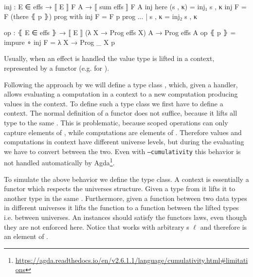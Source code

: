 \begin{code}
inj : E ∈ effs → ⟦ E ⟧ F A → ⟦ sum effs ⟧ F A
inj here           (s , κ) = inj₁ s , κ
inj {F = F} (there ⦃ p ⦄)  prog with inj {F = F} p prog
... | s , κ = inj₂ s , κ

op : ⦃ E ∈ effs ⦄ → ⟦ E ⟧ (λ X → Prog effs X) A → Prog effs A
op ⦃ p ⦄ = impure ∘ inj {F = λ X → Prog _ X} p
\end{code}
Usually, when an effect is handled the value type is lifted in a context,
represented by a functor (e.g.  for ).

Following the approach by \citeauthor{DBLP:conf/haskell/WuSH14} we will define a
type class , which, given a handler, allows evaluating a
computation in a context to a new computation producing values in the context.
To define such a type class we first have to define a context.
The normal definition of a functor does not suffice, because it lifts all type
to the same .
This is problematic, because scoped operations can only capture elements of
, while computations are elements of .
Therefore values and computations in context have different universe levels, but
during the evaluating we have to convert between the two. 
Even with \texttt{--cumulativity} this behavior is not handled automatically by
Agda\footnote{\url{https://agda.readthedocs.io/en/v2.6.1.1/language/cumulativity.html\#limitations}}.

To simulate the above behavior we define the  type class.
A context is essentially a functor which respects the universes structure.
Given a type from  it lifts it to another type in the same
.
Furthermore, given a function between two data types in different universes it
lifts the function to a function between the lifted types i.e. between
universes.
An instances should satisfy the functors laws, even though they are not enforced
here.
Notice that  works with arbitrary s
$\ell$ and therefore is an element of .

